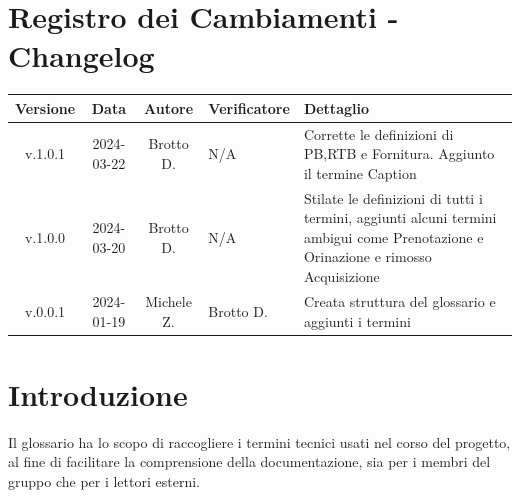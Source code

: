 \documentclass[12pt, oneside]{article}
\begin{document}
\section*{Registro dei Cambiamenti - Changelog}
\begin{tabular}{|c|c|c|p{3cm}|p{6cm}|}
\hline
\textbf{Versione} & \textbf{Data} & \textbf{Autore} & \textbf{Verificatore} & \textbf{Dettaglio} \\
\hline
v.1.0.1 & 2024-03-22 & Brotto D. & N/A & Corrette le definizioni di PB,RTB e Fornitura. Aggiunto il termine Caption\\
\hline
v.1.0.0 & 2024-03-20 & Brotto D. & N/A & Stilate le definizioni di tutti i termini, aggiunti alcuni termini ambigui come Prenotazione e Orinazione e rimosso Acquisizione \\
\hline
v.0.0.1 & 2024-01-19 & Michele Z. & Brotto D. & Creata struttura del glossario e aggiunti i termini \\
\hline
\end{tabular}
\newpage

\tableofcontents
\newpage
\section{Introduzione}
Il glossario ha lo scopo di raccogliere i termini tecnici usati nel corso del progetto, al fine di facilitare la comprensione della documentazione, sia per i membri del gruppo che per i lettori esterni.
\newpage


























\end{document}
